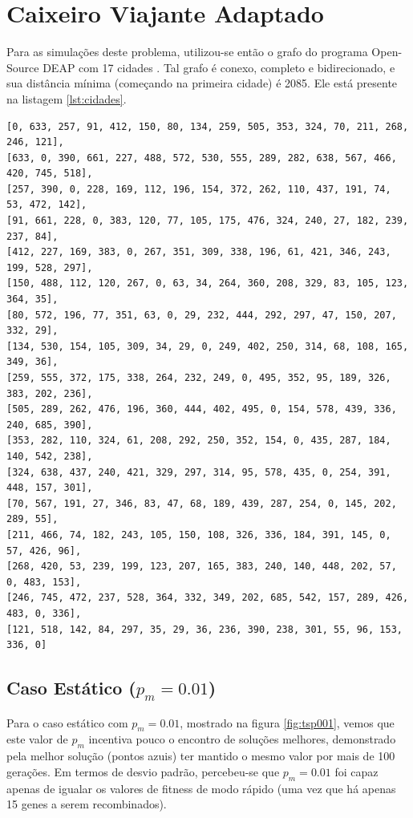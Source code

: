 \section{Caixeiro Viajante Adaptado}

Para as simulações deste problema, utilizou-se então o grafo do programa Open-Source DEAP com 17 cidades \cite{DEAP_JMLR2012, deap2016tsp}. Tal grafo é conexo, completo e bidirecionado, e sua distância mínima (começando na primeira cidade) é 2085. Ele está presente na listagem \ref{lst:cidades}.

\begin{lstlisting}[float, floatplacement=H, caption={Mapa de cidades para o problema do Caixeiro Viajante Adaptado.}, label=lst:cidades]
[0, 633, 257, 91, 412, 150, 80, 134, 259, 505, 353, 324, 70, 211, 268, 246, 121],
[633, 0, 390, 661, 227, 488, 572, 530, 555, 289, 282, 638, 567, 466, 420, 745, 518],
[257, 390, 0, 228, 169, 112, 196, 154, 372, 262, 110, 437, 191, 74, 53, 472, 142],
[91, 661, 228, 0, 383, 120, 77, 105, 175, 476, 324, 240, 27, 182, 239, 237, 84],
[412, 227, 169, 383, 0, 267, 351, 309, 338, 196, 61, 421, 346, 243, 199, 528, 297],
[150, 488, 112, 120, 267, 0, 63, 34, 264, 360, 208, 329, 83, 105, 123, 364, 35],
[80, 572, 196, 77, 351, 63, 0, 29, 232, 444, 292, 297, 47, 150, 207, 332, 29],
[134, 530, 154, 105, 309, 34, 29, 0, 249, 402, 250, 314, 68, 108, 165, 349, 36],
[259, 555, 372, 175, 338, 264, 232, 249, 0, 495, 352, 95, 189, 326, 383, 202, 236],
[505, 289, 262, 476, 196, 360, 444, 402, 495, 0, 154, 578, 439, 336, 240, 685, 390],
[353, 282, 110, 324, 61, 208, 292, 250, 352, 154, 0, 435, 287, 184, 140, 542, 238],
[324, 638, 437, 240, 421, 329, 297, 314, 95, 578, 435, 0, 254, 391, 448, 157, 301],
[70, 567, 191, 27, 346, 83, 47, 68, 189, 439, 287, 254, 0, 145, 202, 289, 55],
[211, 466, 74, 182, 243, 105, 150, 108, 326, 336, 184, 391, 145, 0, 57, 426, 96],
[268, 420, 53, 239, 199, 123, 207, 165, 383, 240, 140, 448, 202, 57, 0, 483, 153],
[246, 745, 472, 237, 528, 364, 332, 349, 202, 685, 542, 157, 289, 426, 483, 0, 336],
[121, 518, 142, 84, 297, 35, 29, 36, 236, 390, 238, 301, 55, 96, 153, 336, 0]
\end{lstlisting}

\subsection{Caso Estático ($p_m = 0.01$)}

Para o caso estático com $p_m = 0.01$, mostrado na figura \ref{fig:tsp001}, vemos que este valor de $p_m$ incentiva pouco o encontro de soluções melhores, demonstrado pela melhor solução (pontos azuis) ter mantido o mesmo valor por mais de 100 gerações. Em termos de desvio padrão, percebeu-se que $p_m = 0.01$ foi capaz apenas de igualar os valores de fitness de modo rápido (uma vez que há apenas 15 genes a serem recombinados).

